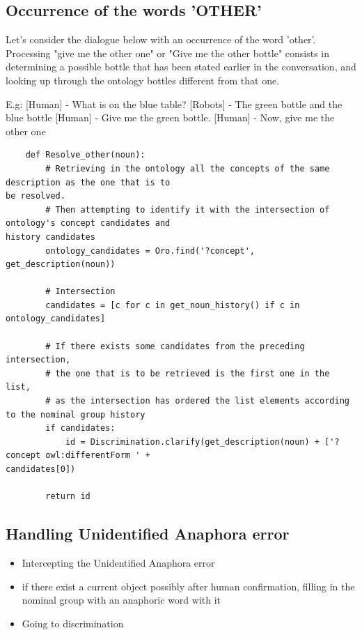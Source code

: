 \documentclass[twoside,a4paper,10pt]{report}
\begin{document}
\subsection{Occurrence of the words 'OTHER'}
\label{b7ebf691f8433bd42593d3ebb2d2c14a}%

Let's consider the dialogue below with an occurrence of the word 'other'. Processing "give me the other one" or "Give me the other bottle" consists in determining a possible bottle that has been stated earlier in the conversation, and looking up through the ontology bottles different from that one.


\small
\begin{verbatimtab}
  E.g:
  [Human]  - What is on the blue table?
  [Robots] - The green bottle and the blue bottle
  [Human]  - Give me the green bottle.
  [Human]  - Now, give me the other one 
\end{verbatimtab}
\normalsize

\lstset{language=python}
\begin{lstlisting}
    def Resolve_other(noun):
        # Retrieving in the ontology all the concepts of the same description as the one that is to
be resolved.
        # Then attempting to identify it with the intersection of ontology's concept candidates and
history candidates
        ontology_candidates = Oro.find('?concept', get_description(noun))
        
        # Intersection
        candidates = [c for c in get_noun_history() if c in ontology_candidates]
        
        # If there exists some candidates from the preceding intersection, 
        # the one that is to be retrieved is the first one in the list,
        # as the intersection has ordered the list elements according to the nominal group history
        if candidates:
            id = Discrimination.clarify(get_description(noun) + ['?concept owl:differentForm ' +
candidates[0])
                
        return id

\end{lstlisting}

\subsection{Handling Unidentified Anaphora error}
\label{e79def79eebc0ce87924efaa796970ff}%

\begin{itemize}
    \item  Intercepting the Unidentified Anaphora error
    \item  if there exist a current object possibly after human confirmation, filling in the nominal group with an anaphoric word with it
    \item  Going to discrimination
\end{itemize}
\end{document}
